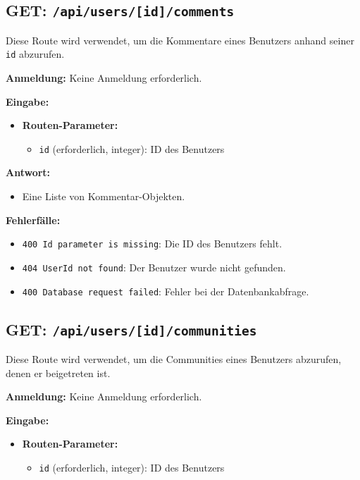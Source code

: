 \documentclass[a4paper,12pt]{article}
\begin{document}
\newpage
\subsection{GET: \texttt{/api/users/[id]/comments}}

Diese Route wird verwendet, um die Kommentare eines Benutzers anhand seiner
\texttt{id} abzurufen.

\textbf{Anmeldung:} Keine Anmeldung erforderlich.

\textbf{Eingabe:}
\begin{itemize}
    \item \textbf{Routen-Parameter:}
    \begin{itemize}
        \item \texttt{id} (erforderlich, integer):
            ID des Benutzers
    \end{itemize}
\end{itemize}

\textbf{Antwort:}
\begin{itemize}
    \item Eine Liste von Kommentar-Objekten.
\end{itemize}

\textbf{Fehlerfälle:}
\begin{itemize}
    \item \texttt{400 Id parameter is missing}:
        Die ID des Benutzers fehlt.
    \item \texttt{404 UserId not found}:
        Der Benutzer wurde nicht gefunden.
    \item \texttt{400 Database request failed}:
        Fehler bei der Datenbankabfrage.
\end{itemize}

\subsection{GET: \texttt{/api/users/[id]/communities}}

Diese Route wird verwendet, um die Communities eines Benutzers abzurufen, denen
er beigetreten ist.

\textbf{Anmeldung:} Keine Anmeldung erforderlich.

\textbf{Eingabe:}
\begin{itemize}
    \item \textbf{Routen-Parameter:}
    \begin{itemize}
        \item \texttt{id} (erforderlich, integer):
            ID des Benutzers
    \end{itemize}
\end{itemize}
\end{document}
